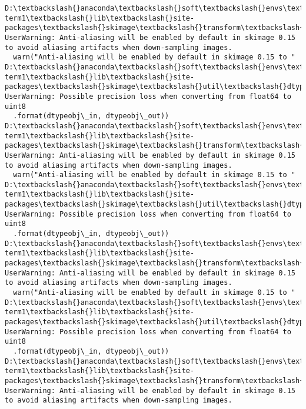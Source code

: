 \documentclass[11pt]{article}
\begin{document}
    \begin{Verbatim}[commandchars=\\\{\}]
D:\textbackslash{}anaconda\textbackslash{}soft\textbackslash{}envs\textbackslash{}carnd-term1\textbackslash{}lib\textbackslash{}site-packages\textbackslash{}skimage\textbackslash{}transform\textbackslash{}\_warps.py:110: UserWarning: Anti-aliasing will be enabled by default in skimage 0.15 to avoid aliasing artifacts when down-sampling images.
  warn("Anti-aliasing will be enabled by default in skimage 0.15 to "
D:\textbackslash{}anaconda\textbackslash{}soft\textbackslash{}envs\textbackslash{}carnd-term1\textbackslash{}lib\textbackslash{}site-packages\textbackslash{}skimage\textbackslash{}util\textbackslash{}dtype.py:130: UserWarning: Possible precision loss when converting from float64 to uint8
  .format(dtypeobj\_in, dtypeobj\_out))
D:\textbackslash{}anaconda\textbackslash{}soft\textbackslash{}envs\textbackslash{}carnd-term1\textbackslash{}lib\textbackslash{}site-packages\textbackslash{}skimage\textbackslash{}transform\textbackslash{}\_warps.py:110: UserWarning: Anti-aliasing will be enabled by default in skimage 0.15 to avoid aliasing artifacts when down-sampling images.
  warn("Anti-aliasing will be enabled by default in skimage 0.15 to "
D:\textbackslash{}anaconda\textbackslash{}soft\textbackslash{}envs\textbackslash{}carnd-term1\textbackslash{}lib\textbackslash{}site-packages\textbackslash{}skimage\textbackslash{}util\textbackslash{}dtype.py:130: UserWarning: Possible precision loss when converting from float64 to uint8
  .format(dtypeobj\_in, dtypeobj\_out))
D:\textbackslash{}anaconda\textbackslash{}soft\textbackslash{}envs\textbackslash{}carnd-term1\textbackslash{}lib\textbackslash{}site-packages\textbackslash{}skimage\textbackslash{}transform\textbackslash{}\_warps.py:110: UserWarning: Anti-aliasing will be enabled by default in skimage 0.15 to avoid aliasing artifacts when down-sampling images.
  warn("Anti-aliasing will be enabled by default in skimage 0.15 to "
D:\textbackslash{}anaconda\textbackslash{}soft\textbackslash{}envs\textbackslash{}carnd-term1\textbackslash{}lib\textbackslash{}site-packages\textbackslash{}skimage\textbackslash{}util\textbackslash{}dtype.py:130: UserWarning: Possible precision loss when converting from float64 to uint8
  .format(dtypeobj\_in, dtypeobj\_out))
D:\textbackslash{}anaconda\textbackslash{}soft\textbackslash{}envs\textbackslash{}carnd-term1\textbackslash{}lib\textbackslash{}site-packages\textbackslash{}skimage\textbackslash{}transform\textbackslash{}\_warps.py:110: UserWarning: Anti-aliasing will be enabled by default in skimage 0.15 to avoid aliasing artifacts when down-sampling images.

\end{Verbatim}
\end{document}
